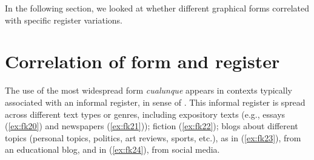 \documentclass[output=paper,colorlinks,citecolor=brown]{langscibook}
\begin{document}
In the following section, we looked at whether different graphical forms correlated with specific register variations.


\section{Correlation of form and register}\label{sec:fk3}
The use of the most widespread form \textit{cualunque} appears in contexts typically associated with an informal register, in sense of \citet{KochOesterreicher2011}. This informal register is spread across different text types or genres, including expository texts (e.g., essays (\ref{ex:fk20}) and newspapers (\ref{ex:fk21})); fiction (\ref{ex:fk22}); blogs about different topics (personal topics, politics, art reviews, sports, etc.), as in (\ref{ex:fk23}), from an educational blog, and in (\ref{ex:fk24}), from social media. 
\end{document}
